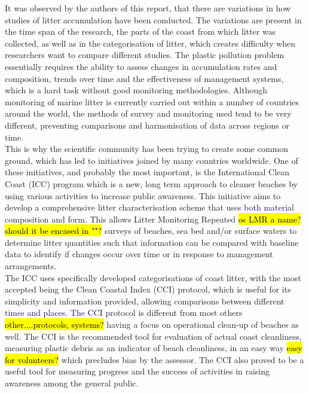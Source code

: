 \documentclass[10pt]{article}\usepackage[]{graphicx}\usepackage[]{color}
\begin{document}
It was observed by the authors of this report, that there are variations in how studies of litter accumulation have been conducted. The variations are present in the time span of the research, the parts of the coast from which litter was collected, as well as in the categorisation of litter, which creates difficulty when researchers want to compare different studies. The plastic pollution problem essentially requires the ability to assess changes in accumulation rates and composition, trends over time and the effectiveness of management systems, which is a hard task without good monitoring methodologies. Although monitoring of marine litter is currently carried out within a number of countries around the world, the methods of survey and monitoring used tend to be very different, preventing comparisons and harmonisation of data across regions or time. \\

This is why the scientific community has been trying to create some common ground, which has led to initiatives joined by many countries worldwide. One of these initiatives, and probably the most important, is the International Clean Coast (ICC) program which is a new, long term approach to cleaner beaches by using various activities to increase public awareness. \cite{ CHESHIRE2009} This initiative aims to develop a comprehensive litter characterisation scheme that uses both material composition and form. This allows Litter Monitoring Repeated \hl{os LMR a name? should it be encased in ""?} surveys of beaches, sea bed and/or surface waters to determine litter quantities such that information can be compared with baseline data to identify if changes occur over time or in response to management arrangements. \\

The ICC uses specifically developed categorisations of coast litter, with the most accepted being the Clean Coastal Index (CCI) protocol, which is useful for its simplicity and information provided, allowing comparisons between different times and places. The CCI protocol is different from most others \hl{other....protocols, systems?} having a focus on operational clean-up of beaches as well. The CCI is the recommended tool for evaluation of actual coast cleanliness, measuring plastic debris as an indicator of beach cleanliness, in an easy way \hl{easy for volunteers?} which precludes bias by the assessor. The CCI also proved to be a useful tool for measuring progress and the success of activities in raising awareness among the general public. \cite{ALKALAY2007} \\
\end{document}
